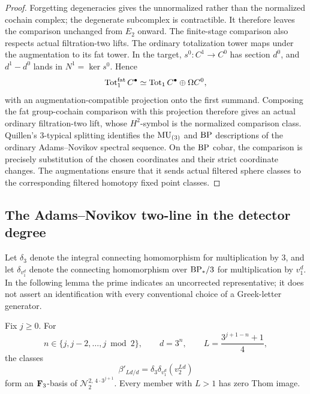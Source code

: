\begin{proof}
Forgetting degeneracies gives the unnormalized rather than the
normalized cochain complex; the degenerate subcomplex is
contractible.  It therefore leaves the comparison unchanged from
\(E_2\) onward.  The finite-stage comparison also respects actual
filtration-two lifts.  The ordinary totalization tower maps under
the augmentation to its fat tower.  In the target,
\(s^0:C^1\to C^0\) has section \(d^0\), and \(d^1-d^0\)
lands in \(N^1=\ker s^0\).  Hence
\[
 \operatorname{Tot}^{\mathrm{fat}}_1 C^\bullet
 \simeq \operatorname{Tot}_1 C^\bullet\oplus\Omega C^0,
\]
with an augmentation-compatible projection onto the first summand.
Composing the fat group-cochain comparison with this projection
therefore gives an actual ordinary filtration-two lift, whose
\(H^2\)-symbol is the normalized comparison class.
Quillen's \(3\)-typical splitting
\cite[Theorems~4--5]{Quillen} identifies the
\(\mathrm{MU}_{(3)}\) and \(\mathrm{BP}\) descriptions of the ordinary
Adams--Novikov spectral sequence.
On the \(\mathrm{BP}\) cobar, the comparison is precisely substitution of
the chosen coordinates and their strict coordinate changes.
The augmentations ensure that it sends actual filtered sphere
classes to the corresponding filtered homotopy fixed point classes.
\end{proof}

\subsection{The Adams--Novikov two-line in the detector degree}

Let \(\delta_3\) denote the integral connecting homomorphism for
multiplication by \(3\), and let \(\delta_{v_1^d}\) denote the
connecting homomorphism over \(\mathrm{BP}_*/3\) for multiplication by
\(v_1^d\).  In the following lemma the prime indicates an
uncorrected representative; it does not assert an identification
with every conventional choice of a Greek-letter generator.

\begin{lemma}\label{det:two-line-basis}
Fix \(j\geq0\).  For
\[
 n\in\{j,j-2,\ldots,j\bmod2\},\qquad
 d=3^n,\qquad L=\frac{3^{j+1-n}+1}{4},
\]
the classes
\begin{equation}\label{det:uncorrected-beta}
 \beta'_{Ld/d}=\delta_3\delta_{v_1^d}(v_2^{Ld})
\end{equation}
form an \(\mathbf F_3\)-basis of
\(\mathcal N_2^{2,\,4\cdot3^{j+1}}\).
Every member with \(L>1\) has zero Thom image.
\end{lemma}

